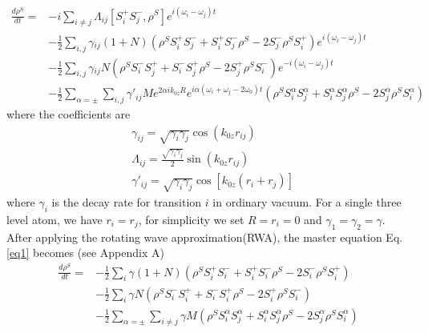 \documentclass{article}
\begin{document}
\begin{equation}
\label{eq1}
\begin{split}
\frac{d\rho^{S}}{dt}=&-i\underset{i\neq j}{\sum}\Lambda_{ij}[S_{i}^{+}S_{j}^{-},\rho^{S}]e^{i(\omega_{i}-\omega_{j})t}\\
&-\frac{1}{2}\underset{i,j}{\sum}\gamma{}_{ij}(1+N)(\rho^{S}S_{i}^{+}S_{j}^{-}+S_{i}^{+}S_{j}^{-}\rho^{S}-2S_{j}^{-}\rho^{S}S_{i}^{+})e^{i(\omega_{i}-\omega_{j})t} \\
&-\frac{1}{2}\underset{i,j}{\sum}\gamma{}_{ij}N(\rho^{S}S_{i}^{-}S_{j}^{+}+S_{i}^{-}S_{j}^{+}\rho^{S}-2S_{j}^{+}\rho^{S}S_{i}^{-})e^{-i(\omega_{i}-\omega_{j})t}\\
&-\frac{1}{2}\sum_{\alpha=\pm}\underset{i,j}{\sum}\gamma'_{ij}Me^{2\alpha ik_{0z}R}e^{i\alpha(\omega_i+\omega_j-2\omega_0)t}(\rho^{S}S_{i}^{\alpha}S_{j}^{\alpha}+S_{i}^{\alpha}S_{j}^{\alpha}\rho^{S}-2S_{j}^{\alpha}\rho^{S}S_{i}^{\alpha})
\end{split}
\end{equation}
where the coefficients are
\begin{equation}
\label{eq2}
\begin{split}
& \gamma_{ij}=\sqrt{\gamma_{i}\gamma_{j}}\cos(k_{0z}r_{ij}) \\
& \Lambda_{ij}=\frac{\sqrt{\gamma_{i}\gamma_{j}}}{2}\sin(k_{0z}r_{ij})\\
& \gamma'_{ij}=\sqrt{\gamma_{i}\gamma_{j}}\cos[k_{0z}(r_{i}+r_{j})]
\end{split}
\end{equation}
where $\gamma_{i}$ is the decay rate for transition $i$ in ordinary vacuum. For a single three level atom, we have $r_i=r_j$, for simplicity we set $R=r_i=0$ and $\gamma_1=\gamma_2=\gamma$. After applying the rotating wave approximation(RWA), the master equation Eq.\eqref{eq1} becomes (see Appendix A)
\begin{equation}
\label{eq3}
\begin{split}
\frac{d\rho^{S}}{dt}=&-\frac{1}{2}\underset{i}{\sum}\gamma(1+N)(\rho^{S}S_{i}^{+}S_{i}^{-}+S_{i}^{+}S_{i}^{-}\rho^{S}-2S_{i}^{-}\rho^{S}S_{i}^{+})\\
&-\frac{1}{2}\underset{i}{\sum}\gamma N(\rho^{S}S_{i}^{-}S_{i}^{+}+S_{i}^{-}S_{i}^{+}\rho^{S}-2S_{i}^{+}\rho^{S}S_{i}^{-})\\
&-\frac{1}{2}\sum_{\alpha=\pm}\underset{i\ne j}{\sum}\gamma M(\rho^{S}S_{i}^{\alpha}S_{j}^{\alpha}+S_{i}^{\alpha}S_{j}^{\alpha}\rho^{S}-2S_{j}^{\alpha}\rho^{S}S_{i}^{\alpha})
\end{split}
\end{equation}
\end{document}

